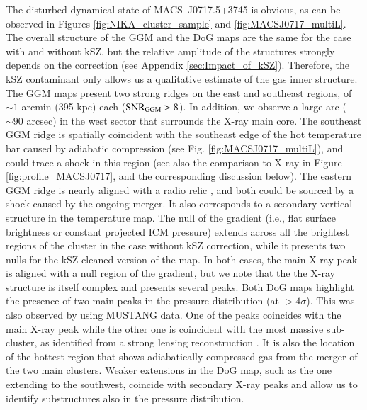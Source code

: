 \documentclass[traditabstract]{aa}
\begin{document}
The disturbed dynamical state of \mbox{MACS~J0717.5+3745} is obvious, as can be observed in Figures \ref{fig:NIKA_cluster_sample} and \ref{fig:MACSJ0717_multiL}. The overall structure of the GGM and the DoG maps are the same for the case with and without kSZ, but the relative amplitude of the structures strongly depends on the correction (see Appendix \ref{sec:Impact_of_kSZ}). Therefore, the kSZ contaminant only allows us a qualitative estimate of the gas inner structure. The GGM maps present two strong ridges on the east and southeast regions, of $\sim 1$ arcmin (395 kpc) each (${\rm SNR}_{\rm GGM} > 8$). In addition, we observe a large arc ($\sim 90$ arcsec) in the west sector that surrounds the X-ray main core. The southeast GGM ridge is spatially coincident with the southeast edge of the hot temperature bar caused by adiabatic compression (see Fig. \ref{fig:MACSJ0717_multiL}), and could trace a shock in this region (see also the comparison to X-ray in Figure \ref{fig:profile_MACSJ0717}, and the corresponding discussion below). The eastern GGM ridge is nearly aligned with a radio relic \citep[see, e.g.,][]{vanWeeren2017}, and both could be sourced by a shock caused by the ongoing merger. It also corresponds to a secondary vertical structure in the temperature map. The null of the gradient (i.e., flat surface brightness or constant projected ICM pressure) extends across all the brightest regions of the cluster in the case without kSZ correction, while it presents two nulls for the kSZ cleaned version of the map. In both cases, the main X-ray peak is aligned with a null region of the gradient, but we note that the the X-ray structure is itself complex and presents several peaks. Both DoG maps highlight the presence of two main peaks in the pressure distribution (at $> 4 \sigma$). This was also observed by \cite{Mroczkowski2012} using MUSTANG data. One of the peaks coincides with the main X-ray peak while the other one is coincident with the most massive sub-cluster, as identified from a strong lensing reconstruction \citep[e.g.,][]{Limousin2015}. It is also the location of the hottest region that shows adiabatically compressed gas from the merger of the two main clusters. Weaker extensions in the DoG map, such as the one extending to the southwest, coincide with secondary X-ray peaks and allow us to identify substructures also in the pressure distribution.
\end{document}
